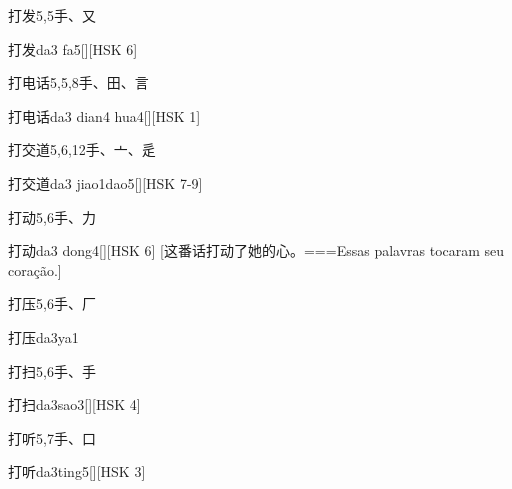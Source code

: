 \begin{Entry}{打发}{5,5}{⼿、⼜}
  \begin{Phonetics}{打发}{da3 fa5}[][HSK 6]
  \end{Phonetics}
\end{Entry}

\begin{Entry}{打电话}{5,5,8}{⼿、⽥、⾔}
  \begin{Phonetics}{打电话}{da3 dian4 hua4}[][HSK 1]
  \end{Phonetics}
\end{Entry}

\begin{Entry}{打交道}{5,6,12}{⼿、⼇、⾡}
  \begin{Phonetics}{打交道}{da3 jiao1dao5}[][HSK 7-9]
  \end{Phonetics}
\end{Entry}

\begin{Entry}{打动}{5,6}{⼿、⼒}
  \begin{Phonetics}{打动}{da3 dong4}[][HSK 6]
    [这番话打动了她的心。===Essas palavras tocaram seu coração.]
  \end{Phonetics}
\end{Entry}

\begin{Entry}{打压}{5,6}{⼿、⼚}
  \begin{Phonetics}{打压}{da3ya1}
  \end{Phonetics}
\end{Entry}

\begin{Entry}{打扫}{5,6}{⼿、⼿}
  \begin{Phonetics}{打扫}{da3sao3}[][HSK 4]
  \end{Phonetics}
\end{Entry}

\begin{Entry}{打听}{5,7}{⼿、⼝}
  \begin{Phonetics}{打听}{da3ting5}[][HSK 3]
  \end{Phonetics}
\end{Entry}


